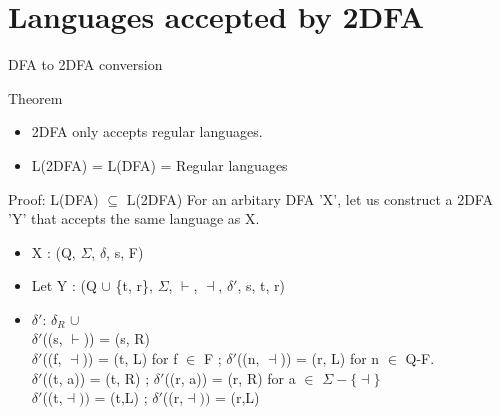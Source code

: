 \documentclass{beamer}
\begin{document}
  \section{Languages accepted by 2DFA}
\begin{frame}{DFA to 2DFA conversion}
\begin{block}{Theorem}
  \begin{itemize}
  \item 2DFA only accepts regular languages.\\
  \item L(2DFA) = L(DFA) = Regular languages\\ 
  \end{itemize}
\end{block}

\begin{block}{Proof: L(DFA) $\subseteq$ L(2DFA)}
  For an arbitary DFA 'X', let us construct a 2DFA 'Y' that accepts the same language as X.\\
  
\begin{itemize}
  \item X : (Q, $\Sigma$, $\delta$, s, F)\\
  \item Let Y : (Q $\cup$ \{t, r\}, $\Sigma$, $\vdash$, $\dashv$, $\delta'$, s, t, r)\\
  \item $\delta'$: $\delta_R$ $\cup $ {\\
$\delta'$((s, $\vdash$)) = (s, R)\\
  $\delta'$((f, $\dashv$)) = (t, L) for f $\in$ F ;\hspace*{0.1cm} $\delta'$((n, $\dashv$)) = (r, L) for n $\in$ Q-F.\\
   $\delta'$((t, a)) = (t, R) ;\hspace*{0.3cm} $\delta'$((r, a)) = (r, R) for a $\in$ $\Sigma-\{\dashv\}$ }\\
   $\delta'$((t,$\dashv))$ = (t,L) ;\hspace*{0.5cm} $\delta'$((r,$\dashv))$ = (r,L)\\
    \end{itemize}
\end{block}
 
\end{frame}
\end{document}
